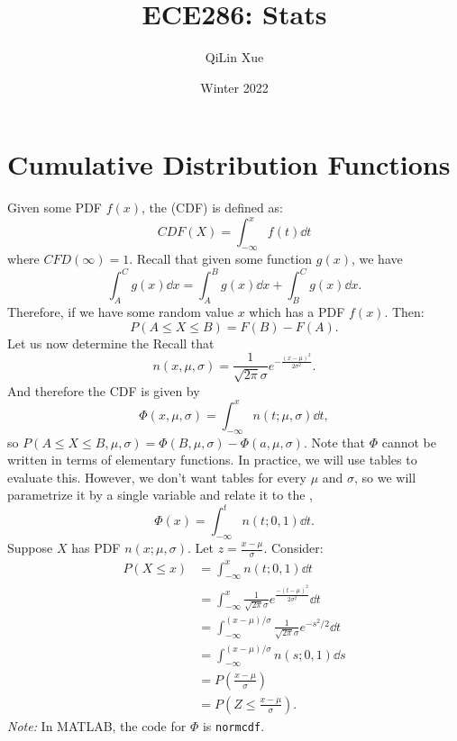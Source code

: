 \documentclass{article}
\title{ECE286: Stats}
\author{QiLin Xue}
\date{Winter 2022}
\numberwithin{equation}{section}
\begin{document}
\maketitle
\tableofcontents
\newpage
\section{Cumulative Distribution Functions}
Given some PDF $f(x)$, the  (CDF) is defined as:  
\begin{equation}
    CDF(X) = \int_{-\infty}^x f(t) \dd{t}
\end{equation}
where $CFD(\infty)=1.$ Recall that given some function $g(x)$, we have 
\begin{equation}
    \int_A^C g(x) \dd{x} = \int_A^B g(x) \dd{x} + \int_B^C g(x) \dd{x}.
\end{equation}
Therefore, if we have some random value $x$ which has a PDF $f(x)$. Then:
\begin{equation}
    P(A\le X \le B) = F(B) - F(A).
\end{equation}
Let us now determine the  Recall that
\begin{equation}
    n(x,\mu,\sigma) = \frac{1}{\sqrt{2\pi}\sigma} e^{-\frac{(x-\mu)^2}{2\sigma^2}}. %
\end{equation}
And therefore the CDF is given by
\begin{equation}
    \Phi(x, \mu, \sigma) = \int_{-\infty}^x n(t;\mu,\sigma) \dd{t},
\end{equation}
so $P(A\le X\le B, \mu, \sigma) = \Phi(B, \mu, \sigma) - \Phi(a, \mu, \sigma).$ Note that $\Phi$ cannot be written in terms of elementary functions. In practice, we will use tables to evaluate this. However, we don't want tables for every $\mu$ and $\sigma$, so we will parametrize it by a single variable and relate it to the ,
\begin{equation}
    \Phi(x) = \int_{-\infty}^t n(t;0,1)\dd{t}.
\end{equation}
Suppose $X$ has PDF $n(x; \mu, \sigma).$ Let $z = \frac{x-\mu}{\sigma}.$ Consider:
\begin{align}
    P(X \le x) &= \int_{-\infty}^x n(t; 0, 1) \dd{t} \\ 
    &= \int_{-\infty}^x \frac{1}{\sqrt{2\pi}\sigma} e^{\frac{-(t-\mu)^2}{2\sigma^2}}\dd{t} \\ 
    &= \int_{-\infty}^{(x-\mu)/\sigma} \frac{1}{\sqrt{2\pi}\sigma} e^{-s^2/2} \dd{t} \\ 
    &= \int_{-\infty}^{(x-\mu)/\sigma} n(s; 0, 1) \dd{s} \\ 
    &= P\left(\frac{x-\mu}{\sigma}\right) \\
    &= P\left(Z \le \frac{x-\mu}{\sigma}\right).
\end{align}
\textit{Note:} In MATLAB, the code for $\Phi$ is \verb#normcdf#.
\end{document}

